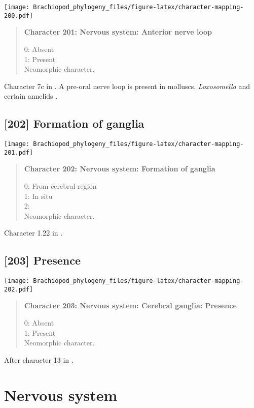 \documentclass[openany]{book}
\theoremstyle{definition}
\theoremstyle{definition}
\theoremstyle{definition}
\theoremstyle{remark}
\begin{document}
\texttt{[image: Brachiopod\_phylogeny\_files/figure-latex/character-mapping-200.pdf]}

\begin{quote}
\textbf{Character 201: Nervous system: Anterior nerve loop}

0: Absent\\
1: Present\\
Neomorphic character.
\end{quote}

Character 7c in \citet{Haszprunar2008}. A pre-oral nerve loop is present
in molluscs, \emph{Loxosomella} and certain annelids
\citep{Wanninger2007}.

\subsection*{{[}202{]} Formation of ganglia}\label{formation-of-ganglia}

\texttt{[image: Brachiopod\_phylogeny\_files/figure-latex/character-mapping-201.pdf]}

\begin{quote}
\textbf{Character 202: Nervous system: Formation of ganglia}

0: From cerebral region\\
1: In situ\\
2:\\
Neomorphic character.
\end{quote}

Character 1.22 in \citet{SPS1996}.

\subsection*{{[}203{]} Presence}\label{presence-5}

\texttt{[image: Brachiopod\_phylogeny\_files/figure-latex/character-mapping-202.pdf]}

\begin{quote}
\textbf{Character 203: Nervous system: Cerebral ganglia: Presence}

0: Absent\\
1: Present\\
Neomorphic character.
\end{quote}

After character 13 in \citet{Haszprunar1996}.

\section{Nervous system}\label{nervous-system-1}
\end{document}
